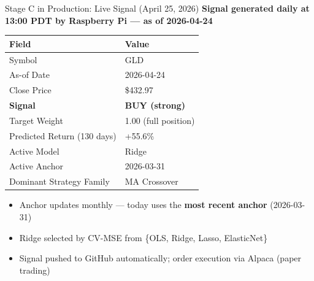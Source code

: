 \documentclass[aspectratio=169]{beamer}
\begin{document}
\begin{frame}{Stage C in Production: Live Signal (April 25, 2026)}
  \textbf{Signal generated daily at 13:00 PDT by Raspberry Pi --- as of 2026-04-24}

  \vspace{0.5em}
  \begin{tabular}{ll}
    \toprule
    Field & Value \\
    \midrule
    Symbol                       & GLD \\
    As-of Date                   & 2026-04-24 \\
    Close Price                  & \$432.97 \\
    \textbf{Signal}              & \textbf{BUY (strong)} \\
    Target Weight                & 1.00 \quad (full position) \\
    Predicted Return (130 days)  & +55.6\% \\
    Active Model                 & Ridge \\
    Active Anchor                & 2026-03-31 \\
    Dominant Strategy Family     & MA Crossover \\
    \bottomrule
  \end{tabular}

  \vspace{0.5em}
  \begin{itemize}
    \item Anchor updates monthly --- today uses the \textbf{most recent anchor} (2026-03-31)
    \item Ridge selected by CV-MSE from \{OLS, Ridge, Lasso, ElasticNet\}
    \item Signal pushed to GitHub automatically; order execution via Alpaca (paper trading)
  \end{itemize}
\end{frame}
\end{document}
